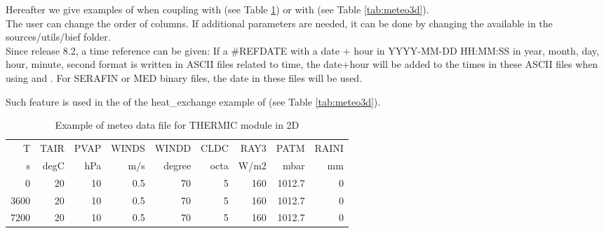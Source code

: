 Hereafter we give examples of 
when coupling with  (see Table \ref{tab:meteo2d})
or with  (see Table \ref{tab:meteo3d}).\\

The user can change the order of columns.
If additional parameters are needed, it can be done
by changing the  available in the
sources/utils/bief folder.\\


Since release 8.2, a time reference can be given:
If a \#REFDATE with a date + hour in YYYY-MM-DD HH:MM:SS
in year, month, day, hour, minute, second format is written in ASCII files
related to time,
the date+hour will be added to the times in these ASCII files
when using  and .
For SERAFIN or MED binary files, the date in these files will be used.

Such feature is used in the  of the
heat\_exchange example of \waqtel (see Table \ref{tab:meteo3d}).


\begin{table}[h]
    \centering
  \begin{tabular}{rrrrrrrrr}
     T & TAIR & PVAP & WINDS & WINDD & CLDC & RAY3 & PATM & RAINI \\
     s & degC & hPa & m/s & degree & octa & W/m2 & mbar & mm \\
     0 & 20 & 10 & 0.5 & 70 & 5 & 160 & 1012.7 & 0 \\
     3600 & 20 & 10 & 0.5 & 70 & 5 & 160 & 1012.7 & 0 \\
     7200 & 20 & 10 & 0.5 & 70 & 5 & 160 & 1012.7 & 0 \\
   \end{tabular}
  \caption{Example of meteo data file for THERMIC module in 2D}\label{tab:meteo2d}
\end{table}

